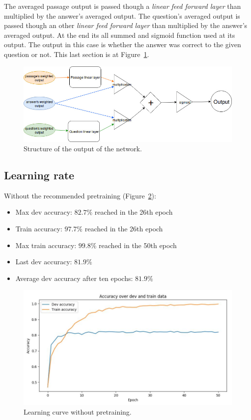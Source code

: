 The averaged passage output is passed though a \textit{linear feed forward layer} than multiplied by the answer's averaged output. The question's averaged output is passed though an other \textit{linear feed forward layer} than multiplied by the answer's averaged output. At the end its all summed and sigmoid function used at its output. The output in this case is whether the answer was correct to the given question or not. This last section is at Figure~\ref{fig:output}.
\begin{figure}[!htb]
	\centering
	\includegraphics[scale=0.5]{TriAN_output.jpg}
	\caption{Structure of the output of the network.}
	\label{fig:output}
\end{figure}

\subsection{Learning rate}
\begin{minipage}{\linewidth}
Without the recommended pretraining (Figure~\ref{fig:learning_curve}):
\begin{itemize}
	\item Max dev accuracy: $82.7\%$ reached in the 26th epoch
	\item Train accuracy: $97.7\%$ reached in the 26th epoch
	\item Max train accuracy: $99.8\%$ reached in the 50th epoch
	\item Last dev accuracy: $81.9\%$
	\item Average dev accuracy after ten epochs: $81.9\%$
\end{itemize}
\end{minipage}
\begin{figure}[!htb]
	\centering
	\includegraphics[scale=0.5]{learning_curve.jpg}
	\caption{Learning curve without pretraining.}
	\label{fig:learning_curve}
\end{figure}

